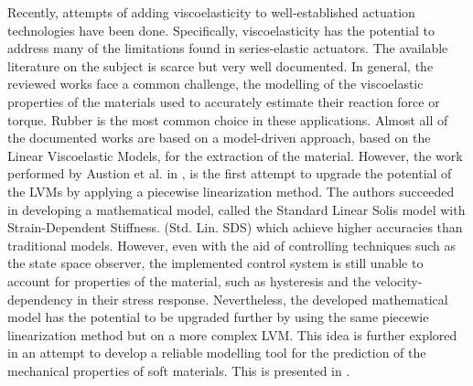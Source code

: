 Recently, attempts of adding viscoelasticity to well-established actuation technologies have been done. Specifically, viscoelasticity has the potential to address many of the limitations found in series-elastic actuators. The available literature on the subject is scarce but very well documented. In general, the reviewed works face a common challenge, the modelling of the viscoelastic properties of the materials used to accurately estimate their reaction force or torque. Rubber is the most common choice in these applications. Almost all of the documented works are based on a model-driven approach, based on the Linear Viscoelastic Models, for the extraction of the material. However, the work performed by Austion et al. in \cite{austin2015control}, is the first attempt to upgrade the potential of the LVMs by applying a piecewise linearization method. The authors succeeded in developing a mathematical model, called the Standard Linear Solis model with Strain-Dependent Stiffness. (Std. Lin. SDS) which achieve higher accuracies than traditional models. However, even with the aid of controlling techniques such as the state space observer, the implemented control system is still unable to account for properties of the material, such as hysteresis and the velocity-dependency in their stress response. Nevertheless, the developed mathematical model has the potential to be upgraded further by using the same piecewie linearization method but on a more complex LVM. This idea is further explored in an attempt to develop a reliable modelling tool for the prediction of the mechanical properties of soft materials. This is presented in .


